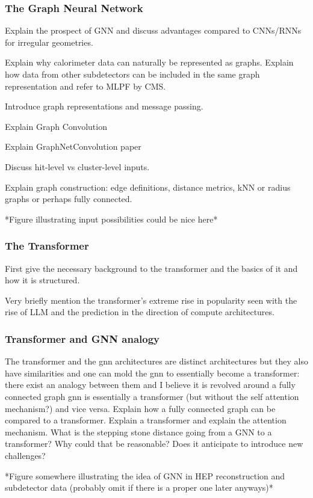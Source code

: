 \subsubsection{The Graph Neural Network}

Explain the prospect of GNN and discuss advantages compared to CNNs/RNNs for irregular geometries.

Explain why calorimeter data can naturally be represented as graphs. Explain how data from other subdetectors can be included in the same graph representation and refer to MLPF by CMS.

Introduce graph representations and message passing.

Explain Graph Convolution

Explain GraphNetConvolution paper \cite{qasim2019-gravnet}

Discuss hit-level vs cluster-level inputs.

Explain graph construction: edge definitions, distance metrics, kNN or radius graphs or perhaps fully connected.

*Figure illustrating input possibilities could be nice here*

\subsubsection{The Transformer}

First give the necessary background to the transformer and the basics of it and how it is structured. 

Very briefly mention the transformer's extreme rise in popularity seen with the rise of LLM and the prediction in the direction of compute architectures.


\subsubsection{Transformer and GNN analogy}

The transformer and the gnn architectures are distinct architectures but they also have similarities and one can mold the gnn to essentially become a transformer: there exist an analogy between them and I believe it is revolved around a fully connected graph gnn is essentially a transformer (but without the self attention mechanism?) and vice versa. Explain how a fully connected graph can be compared to a transformer. Explain a transformer and explain the attention mechanism. What is the stepping stone distance going from a GNN to a transformer? Why could that be reasonable? Does it anticipate to introduce new challenges?



*Figure somewhere illustrating the idea of GNN in HEP reconstruction and subdetector data (probably omit if there is a proper one later anyways)*


